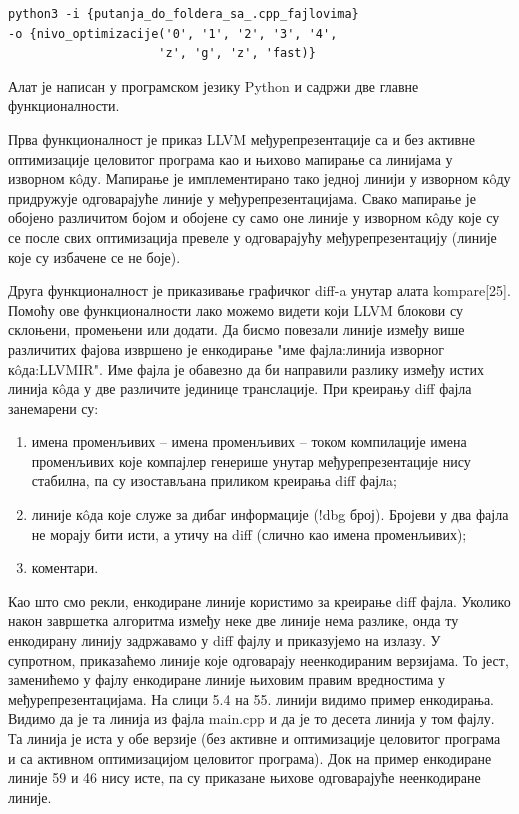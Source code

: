 \documentclass[12pt,oneside]{memoir}
\begin{document}
\begin{lstlisting}[frame=single]
python3 -i {putanja_do_foldera_sa_.cpp_fajlovima}
-o {nivo_optimizacije('0', '1', '2', '3', '4',
                     'z', 'g', 'z', 'fast)}

\end{lstlisting}

Алат је написан у програмском језику Python и садржи две главне функционалности.

Прва функционалност је приказ LLVM међурепрезентације са и без активне оптимизације
целовитог програма као и њихово мапирање са линијама у изворном к\^{o}ду.
Мапирање је имплементирано тако  једној линији у изворном к\^{o}ду придружује
одговарајуће линије у међурепрезентацијама.
Свако мапирање је обојено различитом бојом и обојене су само оне линије у изворном
к\^{o}ду које су се после свих оптимизација превеле у одговарајућу међурепрезентацију
 (линије које су избачене се не боје).
 
Друга функционалност је приказивање графичког diff-a унутар алата kompare[25].
Помоћу ове функционалности лако можемо видети који LLVM блокови су склоњени, 
промењени или додати.
Да бисмо повезали линије између више различитих фајова извршено је енкодирање "име фајла:линија изворног  к\^{o}да:LLVMIR".
Име фајла је обавезно да би направили разлику између истих линија  к\^{o}да у две различите јединице транслације.
При креирању diff фајла занемарени су:
\begin{enumerate}
\item имена променљивих -- имена променљивих -- током компилације имена променљивих које компајлер генерише унутар међурепрезентације нису стабилна, па су изостављана приликом
креирања diff фајлa; 
\item линије к\^{o}да које служе за дибаг информације (!dbg број). Бројеви у два
	фајла не морају бити исти, а утичу на diff (слично као имена променљивих);
\item коментари.
\end{enumerate}
Као што смо рекли, енкодиране линије користимо за креирање diff фајла.
Уколико након завршетка алгоритма између неке две линије нема разлике, онда ту
енкодирану линију задржавамо у diff фајлу и приказујемо на излазу.
У супротном, приказаћемо линије које одговарају неенкодираним верзијама.
То јест, заменићемо у фајлу енкодиране линије њиховим правим вредностима у међурепрезентацијама.
На слици 5.4 на 55. линији видимо пример енкодирања. 
Видимо да је та линија из фајла main.cpp и да је то десета линија у том фајлу.
Та линија је иста у обе верзије (без активне и оптимизације целовитог програма
и са активном оптимизацијом целовитог програма).
Док на пример енкодиране линије 59 и 46 нису исте, па су приказане њихове
 одговарајуће неенкодиране линије. 
\end{document}
